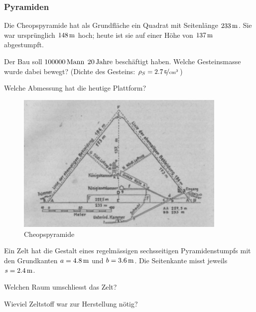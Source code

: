 \documentclass[%
11pt,%
twoside,%
titlepage,%
a4page,%
german,%
headsepline%
]{scrartcl}
\begin{document}
\subsubsection{Pyramiden}
\begin{ueb}
Die Cheopspyramide hat als Grundfl\"ache ein Quadrat mit Seitenl\"ange $\unit[233]{m}$. Sie war urspr\"unglich $\unit[148]{m}$ hoch; heute ist sie auf einer H\"ohe von $\unit[137]{m}$ abgestumpft.
\begin{enumeratea}
\item Der Bau soll $\unit[100000]{Mann}$ $\unit[20]{Jahre}$ besch\"aftigt haben. Welche Gesteinsmasse wurde dabei bewegt? (Dichte des Gesteins: $\rho_S=\unitfrac[2.7]{g}{cm^3}$)
\item Welche Abmessung hat die heutige Plattform?
\end{enumeratea}

\begin{figure}[h!]
\begin{center}
\includegraphics[width=0.9\textwidth]{pictures/cheops}
\caption{Cheopspyramide}
\end{center}
\end{figure}

\end{ueb}

\begin{ueb}
Ein Zelt hat die Gestalt eines regelm\"assigen sechsseitigen Pyramidenstumpfs mit den Grundkanten $a=\unit[4.8]{m}$ und $b=\unit[3.6]{m}$. Die Seitenkante misst jeweils $s=\unit[2.4]{m}$.
\begin{enumeratea}
\item Welchen Raum umschliesst das Zelt?
\item Wieviel Zeltstoff war zur Herstellung n\"otig?
\end{enumeratea}
\end{ueb}
\end{document}
